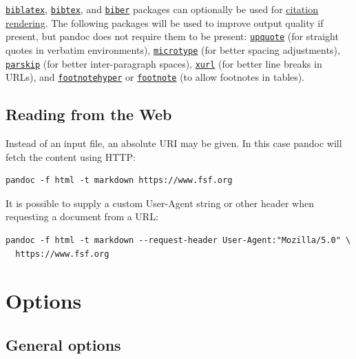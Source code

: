 \documentclass[
  b5paper
]{book}
\begin{document}
\href{https://ctan.org/pkg/biblatex}{\texttt{biblatex}},
\href{https://ctan.org/pkg/bibtex}{\texttt{bibtex}}, and
\href{https://ctan.org/pkg/biber}{\texttt{biber}} packages can
optionally be used for \hyperref[citation-rendering]{citation
rendering}. The following packages will be used to improve output
quality if present, but pandoc does not require them to be present:
\href{https://ctan.org/pkg/upquote}{\texttt{upquote}} (for straight
quotes in verbatim environments),
\href{https://ctan.org/pkg/microtype}{\texttt{microtype}} (for better
spacing adjustments),
\href{https://ctan.org/pkg/parskip}{\texttt{parskip}} (for better
inter-paragraph spaces), \href{https://ctan.org/pkg/xurl}{\texttt{xurl}}
(for better line breaks in URLs), and
\href{https://ctan.org/pkg/footnotehyper}{\texttt{footnotehyper}} or
\href{https://ctan.org/pkg/footnote}{\texttt{footnote}} (to allow
footnotes in tables).

\section{Reading from the Web}\label{reading-from-the-web}

Instead of an input file, an absolute URI may be given. In this case
pandoc will fetch the content using HTTP:

\begin{verbatim}
pandoc -f html -t markdown https://www.fsf.org
\end{verbatim}

It is possible to supply a custom User-Agent string or other header when
requesting a document from a URL:

\begin{verbatim}
pandoc -f html -t markdown --request-header User-Agent:"Mozilla/5.0" \
  https://www.fsf.org
\end{verbatim}

\chapter{Options}\label{options}

\section{General options}\label{general-options}
\end{document}
